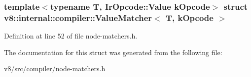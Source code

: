 \subsubsection*{template$<$typename T, Ir\+Opcode\+::\+Value k\+Opcode$>$\newline
struct v8\+::internal\+::compiler\+::\+Value\+Matcher$<$ T, k\+Opcode $>$}



Definition at line 52 of file node-\/matchers.\+h.



The documentation for this struct was generated from the following file\+:\begin{DoxyCompactItemize}
\item 
v8/src/compiler/node-\/matchers.\+h\end{DoxyCompactItemize}
